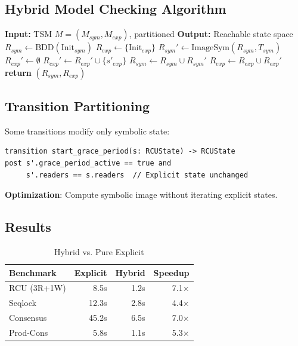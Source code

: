 \documentclass[conference]{IEEEtran}
\begin{document}
\subsection{Hybrid Model Checking Algorithm}

\begin{algorithm}
\caption{Hybrid Symbolic/Explicit Model Checking}
\label{alg:hybrid}
\begin{algorithmic}
\STATE \textbf{Input:} TSM $M = (M_{sym}, M_{exp})$, partitioned
\STATE \textbf{Output:} Reachable state space
\STATE
\STATE $R_{sym} \gets \text{BDD}(\text{Init}_{sym})$ 
\STATE $R_{exp} \gets \{\text{Init}_{exp}\}$ 
\STATE
\REPEAT
  \STATE $R_{sym}' \gets \text{ImageSym}(R_{sym}, T_{sym})$ 
  \STATE $R_{exp}' \gets \emptyset$
      \STATE $R_{exp}' \gets R_{exp}' \cup \{s'_{exp}\}$
    \ENDFOR
  \ENDFOR
  \STATE $R_{sym} \gets R_{sym} \cup R_{sym}'$
  \STATE $R_{exp} \gets R_{exp} \cup R_{exp}'$
\STATE
\STATE \textbf{return} $(R_{sym}, R_{exp})$
\end{algorithmic}
\end{algorithm}

\subsection{Transition Partitioning}

Some transitions modify only symbolic state:
\begin{lstlisting}
transition start_grace_period(s: RCUState) -> RCUState
post s'.grace_period_active == true and
     s'.readers == s.readers  // Explicit state unchanged
\end{lstlisting}

\textbf{Optimization}: Compute symbolic image without iterating explicit states.

\subsection{Results}

\begin{table}[h]
\centering
\caption{Hybrid vs. Pure Explicit}
\label{tab:hybrid_results}
\begin{tabular}{lrrr}
\toprule
\textbf{Benchmark} & \textbf{Explicit} & \textbf{Hybrid} & \textbf{Speedup} \\
\midrule
RCU (3R+1W) & 8.5s & 1.2s & 7.1× \\
Seqlock & 12.3s & 2.8s & 4.4× \\
Consensus & 45.2s & 6.5s & 7.0× \\
Prod-Cons & 5.8s & 1.1s & 5.3× \\
\bottomrule
\end{tabular}
\end{table}
\end{document}
